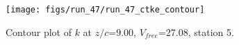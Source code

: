 \begin{figure}[H]
\centering
\texttt{[image: figs/run\_47/run\_47\_ctke\_contour]}
\caption{Contour plot of $k$ at $z/c$=9.00, $V_{free}$=27.08, station 5.}
\label{fig:run_47_ctke_contour}
\end{figure}


